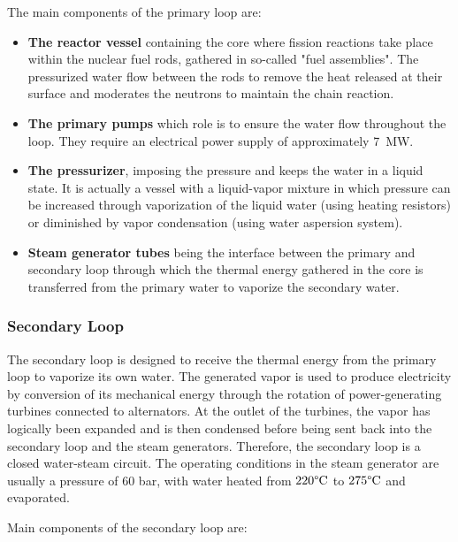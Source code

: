 \npar

The main components of the primary loop are:

\begin{itemize}
\item \textbf{The reactor vessel} containing the core where fission reactions take place within the nuclear fuel rods, gathered in so-called "fuel assemblies". The pressurized water flow between the rods to remove the heat released at their surface and moderates the neutrons to maintain the chain reaction.

\item \textbf{The primary pumps} which role is to ensure the water flow throughout the loop. They require an electrical power supply of approximately 7~MW.

\item \textbf{The pressurizer}, imposing the pressure and keeps the water in a liquid state. It is actually a vessel with a liquid-vapor mixture in which pressure can be increased through vaporization of the liquid water (using heating resistors) or diminished by vapor condensation (using water aspersion system).

\item \textbf{Steam generator tubes} being the interface between the primary and secondary loop through which the thermal energy gathered in the core is transferred from the primary water to vaporize the secondary water.
\end{itemize}


\subsubsection{Secondary Loop}

The secondary loop is designed to receive the thermal energy from the primary loop to vaporize its own water. The generated vapor is used to produce electricity by conversion of its mechanical energy through the rotation of power-generating turbines connected to alternators. At the outlet of the turbines, the vapor has logically been expanded and is then condensed before being sent back into the secondary loop and the steam generators. Therefore, the secondary loop is a closed water-steam circuit. The operating conditions in the steam generator are usually a pressure of 60 bar, with water heated from $220\degree\mathrm{C}$ to $275\degree\mathrm{C}$ and evaporated.

\npar

Main components of the secondary loop are:

